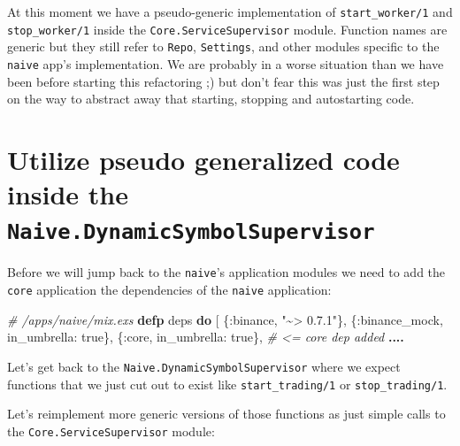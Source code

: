 \documentclass[
  oneside]{book}
\newenvironment{Shaded}{\begin{snugshade}}{\end{snugshade}}
\newcommand{\CommentTok}[1]{\textcolor[rgb]{0.56,0.35,0.01}{\textit{#1}}}
\newcommand{\ConstantTok}[1]{\textcolor[rgb]{0.00,0.00,0.00}{#1}}
\newcommand{\KeywordTok}[1]{\textcolor[rgb]{0.13,0.29,0.53}{\textbf{#1}}}
\newcommand{\NormalTok}[1]{#1}
\newcommand{\OperatorTok}[1]{\textcolor[rgb]{0.81,0.36,0.00}{\textbf{#1}}}
\newcommand{\StringTok}[1]{\textcolor[rgb]{0.31,0.60,0.02}{#1}}
\newcommand{\VariableTok}[1]{\textcolor[rgb]{0.00,0.00,0.00}{#1}}
\begin{document}
At this moment we have a pseudo-generic implementation of \texttt{start\_worker/1} and \texttt{stop\_worker/1} inside the \texttt{Core.ServiceSupervisor} module. Function names are generic but they still refer to \texttt{Repo}, \texttt{Settings}, and other modules specific to the \texttt{naive} app's implementation. We are probably in a worse situation than we have been before starting this refactoring ;) but don't fear this was just the first step on the way to abstract away that starting, stopping and autostarting code.

\hypertarget{utilize-pseudo-generalized-code-inside-the-naive.dynamicsymbolsupervisor}{%
\section{\texorpdfstring{Utilize pseudo generalized code inside the \texttt{Naive.DynamicSymbolSupervisor}}{Utilize pseudo generalized code inside the Naive.DynamicSymbolSupervisor}}\label{utilize-pseudo-generalized-code-inside-the-naive.dynamicsymbolsupervisor}}

Before we will jump back to the \texttt{naive}'s application modules we need to add the \texttt{core} application the dependencies of the \texttt{naive} application:

\begin{Shaded}
\begin{Highlighting}[]
  \CommentTok{\# /apps/naive/mix.exs}
  \KeywordTok{defp}\NormalTok{ deps }\KeywordTok{do}
\NormalTok{    [}
\NormalTok{      \{}\VariableTok{:binance}\NormalTok{, }\StringTok{"\textasciitilde{}\textgreater{} 0.7.1"}\NormalTok{\},}
\NormalTok{      \{}\VariableTok{:binance\_mock}\NormalTok{, }\VariableTok{in\_umbrella:} \ConstantTok{true}\NormalTok{\},}
\NormalTok{      \{}\VariableTok{:core}\NormalTok{, }\VariableTok{in\_umbrella:} \ConstantTok{true}\NormalTok{\}, }\CommentTok{\# \textless{}= core dep added }
      \OperatorTok{....}
\end{Highlighting}
\end{Shaded}

Let's get back to the \texttt{Naive.DynamicSymbolSupervisor} where we expect functions that we just cut out to exist like \texttt{start\_trading/1} or \texttt{stop\_trading/1}.

Let's reimplement more generic versions of those functions as just simple calls to the \texttt{Core.ServiceSupervisor} module:
\end{document}
